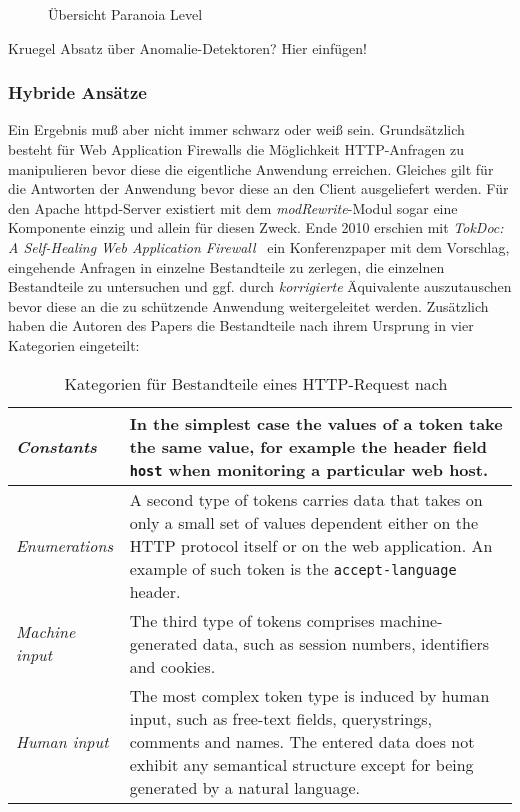 \begin{figure}[ht]
  \centering
  
  \caption{Übersicht Paranoia Level~\cite{owaspcrs}}
  \label{fig.paranoia}
\end{figure}



\begin{neu}
  Kruegel Absatz über Anomalie-Detektoren? Hier einfügen!
\end{neu}

\subsubsection{Hybride Ansätze} %
Ein Ergebnis muß aber nicht immer schwarz oder weiß sein.  Grundsätzlich besteht für Web Application Firewalls die Möglichkeit HTTP-Anfragen zu manipulieren bevor diese die eigentliche Anwendung erreichen. Gleiches gilt für die Antworten der Anwendung bevor diese an den Client ausgeliefert werden. Für den Apache httpd-Server existiert mit dem \emph{modRewrite}-Modul sogar eine Komponente einzig und allein für diesen Zweck. Ende 2010 erschien mit \glqq\emph{TokDoc: A Self-Healing Web Application Firewall}\grqq~\cite{Krueger2010} ein Konferenzpaper mit dem Vorschlag, eingehende Anfragen in einzelne Bestandteile zu zerlegen, die einzelnen Bestandteile zu untersuchen und ggf. durch \emph{korrigierte} Äquivalente auszutauschen bevor diese an die zu schützende Anwendung weitergeleitet werden. Zusätzlich haben die Autoren des Papers die Bestandteile nach ihrem Ursprung in vier Kategorien eingeteilt:

\begin{table}[h]
  \centering
  \begin{tabular}{|l|p{8cm}|}
    \hline
    \emph{Constants} & In the simplest case the values of a token take the same value, for example the header field \verb=host= when monitoring a particular web host. \\
    \hline
    \emph{Enumerations} &  A second type of tokens carries data that takes on only a small set of values dependent either on the HTTP protocol itself or on the web application. An example of such token is the \verb=accept-language= header.\\
    \hline
    \emph{Machine input} & The third type of tokens comprises machine-generated data, such as session numbers, identifiers and cookies. \\
    \hline
    \emph{Human input} & The most complex token type is induced by human input, such as free-text fields, querystrings, comments and names. The entered data does not exhibit any semantical structure except for being generated by a natural language.  \\
    \hline
  \end{tabular}
  \caption{Kategorien für Bestandteile eines HTTP-Request  nach~\cite{Krueger2010}}
  \label{tab:tocdoc}
\end{table}

